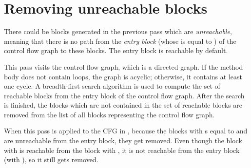 \section{Removing unreachable blocks}

There could be blocks generated in the previous pass which are \textit{unreachable}, meaning that there is no path from
the \textit{entry block} (whose  is equal to ) of the control flow graph to these blocks. The entry
block is reachable by default.

This pass visits the control flow graph, which is a directed graph. If the method body does not contain loops, the graph
is acyclic; otherwise, it contains at least one cycle. A breadth-first search algorithm is used to compute the set of
reachable blocks from the entry block of the control flow graph. After the search is finished, the blocks which are not
contained in the set of reachable blocks are removed from the list of all blocks representing the control flow graph.

When this pass is applied to the CFG in , because the blocks with s equal
to  and  are unreachable from the entry block, they get removed. Even though the block with 
 is reachable from the block with  , it is not reachable from the entry block (with 
), so it still gets removed.
